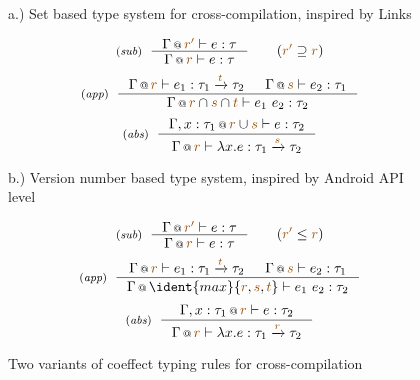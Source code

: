 \begin{figure}[t]

{\small a.) Set based type system for cross-compilation, inspired by Links \cite{app-distributed-links}}

\begin{equation*}
\tyrule{sub}
  {\coctx{\Gamma}{\aclrd{r'}} \vdash e : \tau }
  {\coctx{\Gamma}{\aclrd{r}} \vdash e : \tau }\quad\quad(\aclrd{r'} \supseteq \aclrd{r})
\end{equation*}
\begin{equation*}
\tyrule{app}
  {\coctx{\Gamma}{\aclrd{r}} \vdash e_1 : \tau_1 \xrightarrow{\aclrd{t}} \tau_2 &
   \coctx{\Gamma}{\aclrd{s}} \vdash e_2 : \tau_1 }
  {\coctx{\Gamma}{\aclrd{r} \cap \aclrd{s} \cap \aclrd{t}} \vdash e_1~e_2 : \tau_2}
\end{equation*}
\begin{equation*}
\tyrule{abs}
  {\coctx{\Gamma, x:\tau_1}{\aclrd{r} \cup \aclrd{s}} \vdash e : \tau_2}
  {\coctx{\Gamma}{\aclrd{r}} \vdash \lambda x.e : \tau_1 \xrightarrow{\aclrd{s}} \tau_2 }
\end{equation*}
\vspace{0.5em}

{\small b.) Version number based type system, inspired by Android API level \cite{app-android-multitarget}}

\begin{equation*}
\tyrule{sub}
  {\coctx{\Gamma}{\aclrd{r'}} \vdash e : \tau }
  {\coctx{\Gamma}{\aclrd{r}} \vdash e : \tau }\quad\quad(\aclrd{r'} \leq \aclrd{r})
\end{equation*}
\begin{equation*}
\tyrule{app}
  {\coctx{\Gamma}{\aclrd{r}} \vdash e_1 : \tau_1 \xrightarrow{\aclrd{t}} \tau_2 &
   \coctx{\Gamma}{\aclrd{s}} \vdash e_2 : \tau_1 }
  {\coctx{\Gamma}{\ident{max} \{\aclrd{r}, \aclrd{s}, \aclrd{t} \}} \vdash e_1~e_2 : \tau_2}
\end{equation*}
\begin{equation*}
\tyrule{abs}
  {\coctx{\Gamma, x:\tau_1}{\aclrd{r}} \vdash e : \tau_2}
  {\coctx{\Gamma}{\aclrd{r}} \vdash \lambda x.e : \tau_1 \xrightarrow{\aclrd{r}} \tau_2 }
\end{equation*}

\caption{Two variants of coeffect typing rules for cross-compilation}
\label{fig:applications-flat-cross}
\vspace{-1em}
\end{figure}


